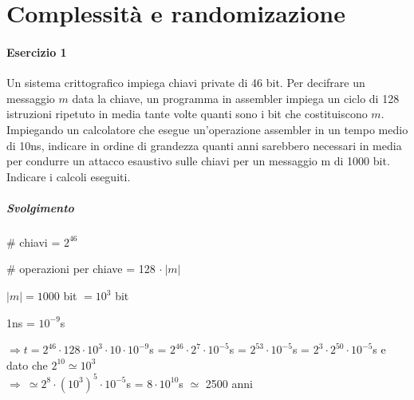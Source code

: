 \documentclass[10pt]{book}
\begin{document}
\section{Complessità e randomizazione}
\paragraph{Esercizio 1} Un sistema crittografico impiega chiavi private di 46 bit. Per decifrare un messaggio $m$ data la
chiave, un programma in assembler impiega un ciclo di 128 istruzioni ripetuto in media tante volte
quanti sono i bit che costituiscono $m$. Impiegando un calcolatore che esegue un'operazione
assembler in un tempo medio di 10ns, indicare in ordine di grandezza quanti anni sarebbero
necessari in media per condurre un attacco esaustivo sulle chiavi per un messaggio m di 1000 bit.\\
Indicare i calcoli eseguiti.
\subparagraph{Svolgimento} \begin{list}{}{}
	\item \# chiavi = $2^{46}$
	\item \# operazioni per chiave = 128 $\cdot\:|m|$
	\item $|m| = 1000$ bit $= 10^3$ bit
	\item 1ns = $10^{-9}$s
	\item $\Rightarrow t = 2^{46}\cdot128\cdot10^3\cdot10\cdot10^{-9}$s = $2^{46}\cdot2^7\cdot10^{-5}$s = $2^{53}\cdot10^{-5}$s = $2^3\cdot2^{50}\cdot10^{-5}$s e dato che $2^{10} \simeq 10^3$\\
	$\Rightarrow\:\simeq 2^8\cdot(10^3)^5\cdot10^{-5}$s = $8\cdot10^{10}$s $\simeq$ 2500 anni
\end{list}
\end{document}
